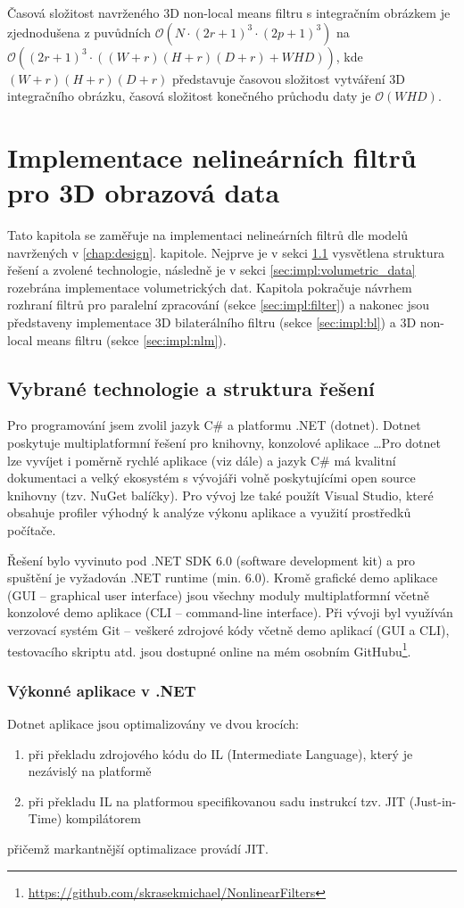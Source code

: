 Časová složitost navrženého 3D non-local means filtru s integračním obrázkem je zjednodušena z puvůdních $\mathcal{O}(N \cdot (2r + 1)^3 \cdot (2p + 1)^3)$ na $\mathcal{O}((2r + 1)^3\cdot((W+r)(H+r)(D+r) + WHD))$, kde $(W+r)(H+r)(D+r)$ představuje časovou složitost vytváření 3D integračního obrázku, časová složitost konečného průchodu daty je $\mathcal{O}(WHD)$.

\chapter{Implementace nelineárních filtrů pro 3D obrazová data}
\label{chap:implementation}
Tato kapitola se zaměřuje na implementaci nelineárních filtrů dle modelů navržených v \ref{chap:design}. kapitole. Nejprve je v sekci \ref{sec:impl:technology} vysvětlena struktura řešení a zvolené technologie, následně je v sekci \ref{sec:impl:volumetric_data} rozebrána implementace volumetrických dat. Kapitola pokračuje návrhem rozhraní filtrů pro paralelní zpracování (sekce \ref{sec:impl:filter}) a nakonec jsou představeny implementace 3D bilaterálního filtru (sekce \ref{sec:impl:bl}) a 3D non-local means filtru (sekce \ref{sec:impl:nlm}).

\section{Vybrané technologie a struktura řešení}
\label{sec:impl:technology}
Pro programování jsem zvolil jazyk C\# a platformu .NET (dotnet). Dotnet poskytuje multiplatformní řešení pro knihovny, konzolové aplikace \dots Pro dotnet lze vyvíjet i poměrně rychlé aplikace (viz dále) a jazyk C\# má kvalitní dokumentaci a velký ekosystém s vývojáři volně poskytujícími open source knihovny (tzv. NuGet balíčky). Pro vývoj lze také použít Visual Studio, které obsahuje profiler výhodný k analýze výkonu aplikace a využití prostředků počítače. 

Řešení bylo vyvinuto pod .NET SDK 6.0 (software development kit) a pro spuštění je vyžadován .NET runtime (min. 6.0). Kromě grafické demo aplikace (GUI -- graphical user interface) jsou všechny moduly multiplatformní včetně konzolové demo aplikace (CLI -- command-line interface). Při vývoji byl využíván verzovací systém Git -- veškeré zdrojové kódy včetně demo aplikací (GUI a CLI), testovacího skriptu atd. jsou dostupné online na mém osobním GitHubu\footnote{\url{https://github.com/skrasekmichael/NonlinearFilters}}.

\subsection*{Výkonné aplikace v .NET}
Dotnet aplikace jsou optimalizovány ve dvou krocích:
\begin{enumerate}
    \item při překladu zdrojového kódu do IL (Intermediate Language), který je nezávislý na platformě
    \item při překladu IL na platformou specifikovanou sadu instrukcí tzv. JIT (Just-in-Time) kompilátorem
\end{enumerate}
přičemž markantnější optimalizace provádí JIT.

